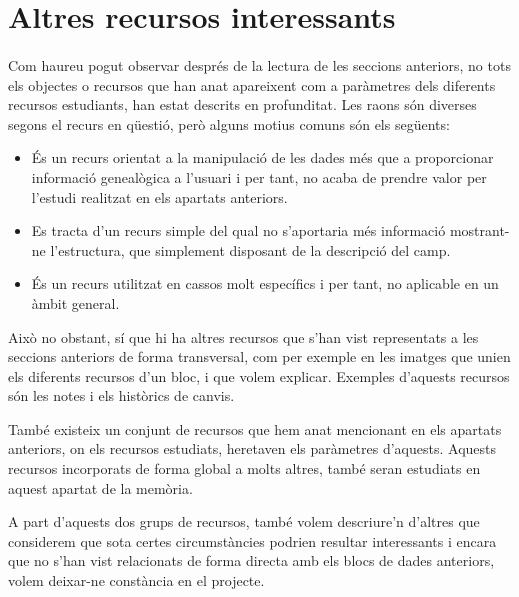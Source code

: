 \section{Altres recursos interessants}

    \paragraph{}
    Com haureu pogut observar després de la lectura de les seccions anteriors, no tots els objectes o recursos que han anat apareixent com a paràmetres dels diferents recursos estudiants, han estat descrits en profunditat. Les raons són diverses segons el recurs en qüestió, però alguns motius comuns són els següents:

    \begin{itemize}
        \item És un recurs orientat a la manipulació de les dades més que a proporcionar informació genealògica a l'usuari i per tant, no acaba de prendre valor per l'estudi realitzat en els apartats anteriors.
        \item Es tracta d'un recurs simple del qual no s'aportaria més informació mostrant-ne l'estructura, que simplement disposant de la descripció del camp.
        \item És un recurs utilitzat en cassos molt específics i per tant, no aplicable en un àmbit general.
    \end{itemize}

    Això no obstant, sí que hi ha altres recursos que s'han vist representats a les seccions anteriors de forma transversal, com per exemple en les imatges que unien els diferents recursos d'un bloc, i que volem explicar. Exemples d'aquests recursos són les notes i els històrics de canvis.

    També existeix un conjunt de recursos que hem anat mencionant en els apartats anteriors, on els recursos estudiats, heretaven els paràmetres d'aquests. Aquests recursos incorporats de forma global a molts altres, també seran estudiats en aquest apartat de la memòria.

    A part d'aquests dos grups de recursos, també volem descriure'n d'altres que considerem que sota certes circumstàncies podrien resultar interessants i encara que no s'han vist relacionats de forma directa amb els blocs de dades anteriors, volem deixar-ne constància en el projecte.

    
    
    
    
    
    
    
    
    
    
